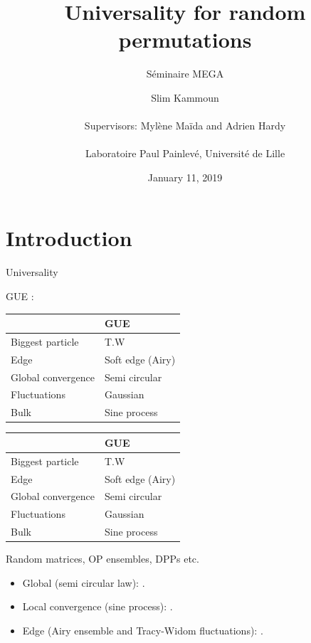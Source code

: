 \documentclass[english,xcolor=table]{beamer}
\title{Universality for random permutations}
\subtitle {Séminaire MEGA}
\author 
{ \large{ Slim Kammoun}
\\  \ \\ \large{Supervisors:  Mylène Maïda  and Adrien Hardy}
\\ \ \\ {Laboratoire Paul Painlevé, Université de Lille}
}
\date {  January 11, 2019}
\begin{document}
\begin{frame}
  \titlepage  
\end{frame}



\section*{Introduction}
\begin{frame}{Universality}
 \begin{overprint}
GUE :
\begin{table}[]
\begin{tabular}{|l|l|}
\hline
                   & GUE              \\ \hline
Biggest particle  & T.W              \\ \hline
Edge               & Soft edge (Airy) \\ \hline
Global convergence & Semi circular    \\ \hline
Fluctuations       & Gaussian         \\ \hline
Bulk               & Sine process     \\ \hline
\end{tabular}
\end{table}


\begin{table}[]
\begin{tabular}{|l|l|}
\hline
                   & GUE              \\ \hline
Biggest particle  & T.W              \\ \hline
Edge               & Soft edge (Airy) \\ \hline
Global convergence & Semi circular    \\ \hline
Fluctuations       & Gaussian         \\ \hline
Bulk               & Sine process     \\ \hline
\end{tabular}
\end{table}
Random matrices, OP ensembles, DPPs etc. 
    \begin{itemize}
        \item Global (semi circular law): 
        \cite{10.2307/1970008,Pastur1972}. 
        \item Local convergence (sine process): \cite*{MR2411912,Erdos2010}.
        \item Edge (Airy ensemble and Tracy-Widom fluctuations): \cite{Soshnikov1999,tao2011}.
     

\end{itemize}
\end{overprint}
\end{frame}
\end{document}

